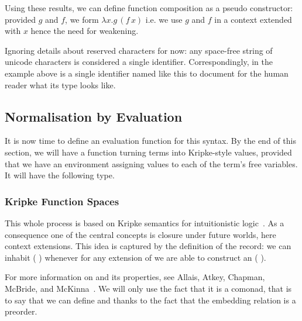 
Using these results, we can define function composition
as a pseudo constructor: provided $g$ and $f$, we form
$λx.g\,(f\, x)$ i.e. we use $g$ and $f$ in a context extended
with $x$ hence the need for weakening.

\label{def:composition}

\begin{remark}
  Ignoring details about reserved characters for now: any
  space-free string of unicode characters is considered a
  single identifier.
  Correspondingly, in the example above  is a single
  identifier named like this to document for the human reader
  what its type looks like.
\end{remark}

\subsection{Normalisation by Evaluation}

It is now time to define an evaluation function for this syntax.
By the end of this section, we will have a function 
turning terms into Kripke-style values,
provided that we have an environment assigning values
to each of the term's free variables. It will have the following type.


\subsubsection{Kripke Function Spaces}

This whole process is based on Kripke semantics for intuitionistic
logic~\cite{DBLP:journals/apal/MitchellM91}.
As a consequence one of the central concepts is closure under future
worlds, here context extensions.
This idea is captured by the definition of the  record: we
can inhabit (  ) whenever for any extension
 of  we are able to construct an ( ).


For more information on  and its properties, see
Allais, Atkey, Chapman, McBride, and
McKinna~\cite[Section~3.1]{DBLP:journals/jfp/AllaisACMM21}.
%
We will only use the fact that it is a comonad, that is to say that
we can define  and  thanks to
the fact that the embedding relation is a preorder.

